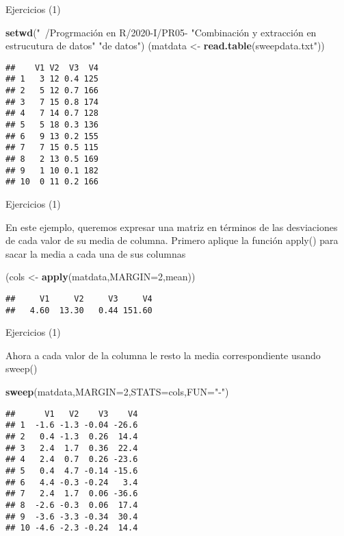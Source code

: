 \documentclass[ignorenonframetext,]{beamer}
\newenvironment{Shaded}{\begin{snugshade}}{\end{snugshade}}
\newcommand{\KeywordTok}[1]{\textcolor[rgb]{0.13,0.29,0.53}{\textbf{#1}}}
\newcommand{\DataTypeTok}[1]{\textcolor[rgb]{0.13,0.29,0.53}{#1}}
\newcommand{\DecValTok}[1]{\textcolor[rgb]{0.00,0.00,0.81}{#1}}
\newcommand{\StringTok}[1]{\textcolor[rgb]{0.31,0.60,0.02}{#1}}
\newcommand{\NormalTok}[1]{#1}
\begin{document}
\begin{frame}[fragile]{Ejercicios (1)}
\begin{Shaded}
\begin{Highlighting}[]
\KeywordTok{setwd}\NormalTok{(}\StringTok{"~/Progrmación en R/2020-I/PR05-}
	\StringTok{"Combinación y extracción en estrucutura de datos"}
	\StringTok{"de datos"}\NormalTok{)}
\NormalTok{(matdata <-}\StringTok{ }\KeywordTok{read.table}\NormalTok{(}\StringTok{sweepdata.txt"}\NormalTok{))}
\end{Highlighting}
\end{Shaded}
\begin{verbatim}
##    V1 V2  V3  V4
## 1   3 12 0.4 125
## 2   5 12 0.7 166
## 3   7 15 0.8 174
## 4   7 14 0.7 128
## 5   5 18 0.3 136
## 6   9 13 0.2 155
## 7   7 15 0.5 115
## 8   2 13 0.5 169
## 9   1 10 0.1 182
## 10  0 11 0.2 166
\end{verbatim}

\end{frame}

\begin{frame}[fragile]{Ejercicios (1)}

En este ejemplo, queremos expresar una matriz en términos de las
desviaciones de cada valor de su media de columna. Primero aplique la
función apply() para sacar la media a cada una de sus columnas

\begin{Shaded}
\begin{Highlighting}[]
\NormalTok{(cols <-}\StringTok{ }\KeywordTok{apply}\NormalTok{(matdata,}\DataTypeTok{MARGIN=}\DecValTok{2}\NormalTok{,mean))}
\end{Highlighting}
\end{Shaded}

\begin{verbatim}
##     V1     V2     V3     V4 
##   4.60  13.30   0.44 151.60
\end{verbatim}

\end{frame}

\begin{frame}[fragile]{Ejercicios (1)}

Ahora a cada valor de la columna le resto la media correspondiente
usando sweep()

\begin{Shaded}
\begin{Highlighting}[]
\KeywordTok{sweep}\NormalTok{(matdata,}\DataTypeTok{MARGIN=}\DecValTok{2}\NormalTok{,}\DataTypeTok{STATS=}\NormalTok{cols,}\DataTypeTok{FUN=}\StringTok{"-"}\NormalTok{)}
\end{Highlighting}
\end{Shaded}

\begin{verbatim}
##      V1   V2    V3    V4
## 1  -1.6 -1.3 -0.04 -26.6
## 2   0.4 -1.3  0.26  14.4
## 3   2.4  1.7  0.36  22.4
## 4   2.4  0.7  0.26 -23.6
## 5   0.4  4.7 -0.14 -15.6
## 6   4.4 -0.3 -0.24   3.4
## 7   2.4  1.7  0.06 -36.6
## 8  -2.6 -0.3  0.06  17.4
## 9  -3.6 -3.3 -0.34  30.4
## 10 -4.6 -2.3 -0.24  14.4
\end{verbatim}

\end{frame}
\end{document}
